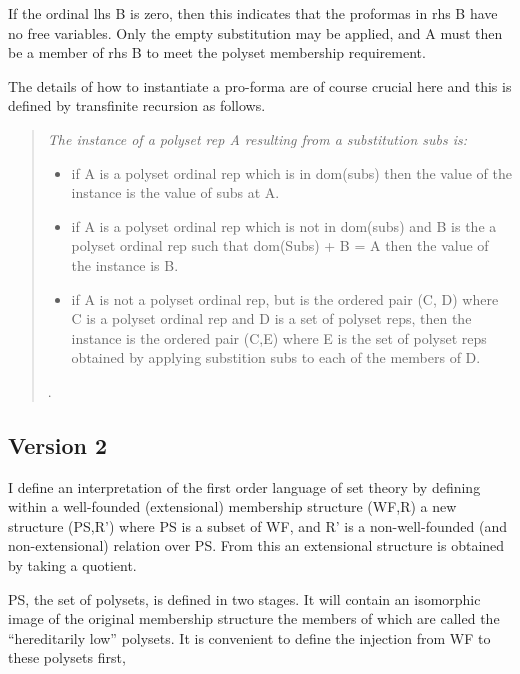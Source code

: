 \documentclass[numreferences]{rbjk}
\begin{document}
\begin{article}
If the ordinal \textsf{lhs B} is zero, then this indicates that the proformas in \textsf{rhs B} have no free variables.
Only the empty substitution may be applied, and \textsf{A} must then be a member of \textsf{rhs B} to meet the polyset membership requirement.

The details of how to instantiate a pro-forma are of course crucial here and this is defined by transfinite recursion as follows.

\begin{quote}
{\it
The instance of a polyset rep \textsf{A} resulting from a substitution \textsf{subs} is:
\begin{itemize}

\item if \textsf{A} is a polyset ordinal rep which is in \textsf{dom(subs)} then the value of the instance is the value of \textsf{subs} at \textsf{A}.

\item if \textsf{A} is a polyset ordinal rep which is not in \textsf{dom(subs)} and \textsf{B} is the a polyset ordinal rep such that \textsf{dom(Subs) + B = A} then the value of the instance is \textsf{B}.

\item if \textsf{A} is not a polyset ordinal rep, but is the ordered pair \textsf{(C, D)} where \textsf{C} is a polyset ordinal rep and \textsf{D} is a set of polyset reps, then the instance is the ordered pair \textsf{(C,E)} where E is the set of polyset reps obtained by applying substition \textsf{subs} to each of the members of \textsf{D}.
\end{itemize}.
}
\end{quote}

\subsection{Version 2}

I define an interpretation of the first order language of set theory by defining within a well-founded (extensional) membership structure \textsf{(WF,R)} a new structure \textsf{(PS,R')} where \textsf{PS} is a subset of \textsf{WF}, and \textsf{R'} is a non-well-founded (and non-extensional) relation over \textsf{PS}. From this an extensional structure is obtained by taking a quotient.

\textsf{PS}, the set of polysets, is defined in two stages.
It will contain an isomorphic image of the original membership structure the members of which are called the ``hereditarily low'' polysets.
It is convenient to define the injection from \textsf{WF} to these polysets first,


\end{article}
\end{document}
